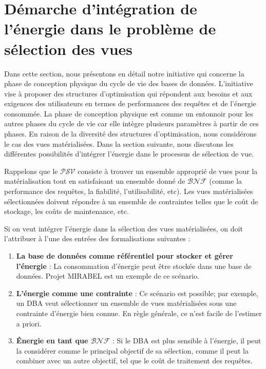 \section{Démarche d'intégration de l'énergie dans le problème de sélection des vues}\label{subsec:ViewSelectionProblem}
Dans cette section, nous présentons en détail notre initiative qui concerne la phase de conception physique du cycle de vie des bases de données. L'initiative vise à proposer des structures d'optimisation qui répondent aux besoins et aux exigences des utilisateurs en termes de performances des requêtes et de l'énergie consommée. La phase de conception physique est comme un entonnoir pour les autres phases du cycle de vie car elle intègre plusieurs paramètres à partir de ces phases. En raison de la diversité des structures d'optimisation, nous considérons le cas des vues matérialisées. Dans la section suivante, nous discutons les différentes possibilités d'intégrer l'énergie dans le processus de sélection de vue.


Rappelons que le $\mathcal{PSV}$ consiste à trouver un ensemble approprié de vues pour la matérialisation tout en satisfaisant un ensemble donné de $\mathcal{BNF}$ (comme la performance des requêtes, la fiabilité, l'utilisabilité, etc). Les vues matérialisées sélectionnées doivent répondre à un ensemble de contraintes telles que le coût de stockage, les coûts de maintenance, etc.

Si on veut intégrer l'énergie dans la sélection des vues matérialisées, on doit l'attribuer à l'une des entrées des formalisations suivantes :
\begin{enumerate}
\item \textbf{La base de données comme référentiel pour stocker et gérer l'énergie} : La consommation d'énergie peut être stockée dans une base de données. Projet MIRABEL \cite{Siksnys12} est un exemple de ce scénario.
\item \textbf{L'énergie comme une contrainte} : Ce scénario est possible; par exemple, un DBA veut sélectionner un ensemble de vues matérialisées sous une contrainte d'énergie bien connue. En règle générale, ce n'est facile de l'estimer a priori.
\item \textbf{Énergie en tant que $\mathcal{BNF}$} : Si le DBA est plus sensible à l'énergie, il peut la considérer comme le principal objectif de sa sélection, comme il peut la combiner avec un autre objectif, tel que le coût de traitement des requêtes.
\end{enumerate}

